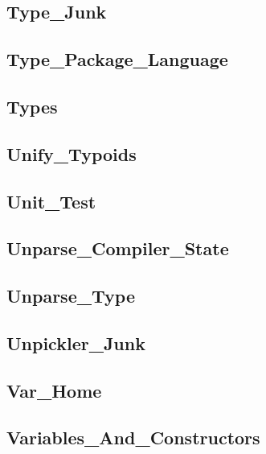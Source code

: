 \subsection{Type\_Junk}					
\subsection{Type\_Package\_Language}			
\subsection{Types}					
\subsection{Unify\_Typoids}				
\subsection{Unit\_Test}					
\subsection{Unparse\_Compiler\_State}			
\subsection{Unparse\_Type}				
\subsection{Unpickler\_Junk}				
\subsection{Var\_Home}					
\subsection{Variables\_And\_Constructors}		


